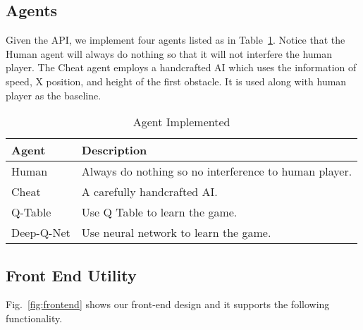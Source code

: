 \documentclass[conference]{IEEEtran}
\begin{document}
\subsection{Agents}
Given the API, we implement four agents listed as in Table~\ref{tab:agent}. Notice that the Human agent will always do nothing so that it will not interfere the human player. The Cheat agent employs a handcrafted AI which uses the information of speed, X position, and height of the first obstacle. It is used along with human player as the baseline.

\begin{table}[!t]
\renewcommand{\arraystretch}{1.3}
\caption{Agent Implemented}
\label{tab:agent}
\centering
\begin{tabular}{l l}
\hline
Agent & Description \\
\hline
Human & Always do nothing so no interference to human player.\\
\hline
Cheat & A carefully handcrafted AI. \\
\hline
Q-Table & Use Q Table to learn the game. \\
\hline
Deep-Q-Net & Use neural network to learn the game. \\
\hline
\end{tabular}
\end{table}


\subsection{Front End Utility}
Fig.~\ref{fig:frontend} shows our front-end design and it supports the following functionality.
\end{document}

